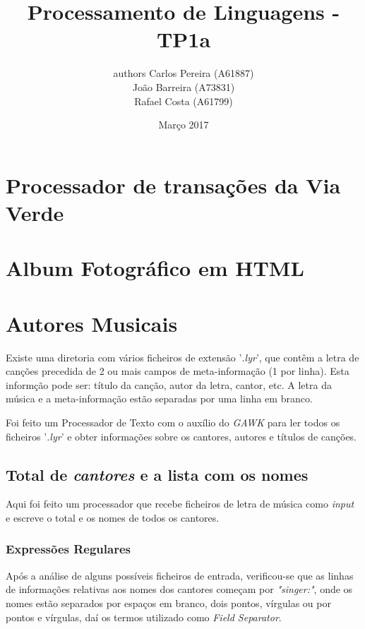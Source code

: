\documentclass{article}
\title{\textbf{Processamento de Linguagens - TP1a}}
\author{\begin{tabular}{authors}
            \textbf{} Carlos Pereira (A61887) \\ João Barreira (A73831) \\ Rafael Costa (A61799)
        \end{tabular}
       }
\date{Março 2017}
\begin{document}
\maketitle

\section{Processador de transações da Via Verde}



\section{Album Fotográfico em HTML}



\section{Autores Musicais}

Existe uma diretoria com vários ficheiros de extensão '\emph{.lyr}', que contêm a letra de canções precedida de 2 ou mais campos de meta-informação (1 por linha). Esta informção pode ser: título da canção, autor da letra, cantor, etc. A letra da música e a meta-informação estão separadas por uma linha em branco.

Foi feito um Processador de Texto com o auxílio do \emph{GAWK} para ler todos os ficheiros '\emph{.lyr}' e obter informações sobre os cantores, autores e títulos de canções.

\subsection{Total de \emph{cantores} e a lista com os nomes}

Aqui foi feito um processador que recebe ficheiros de letra de música como \emph{input} e escreve o total e os nomes de todos os cantores.

\subsubsection{Expressões Regulares}

Após a análise de alguns possíveis ficheiros de entrada, verificou-se que as linhas de informações relativas aos nomes dos cantores começam por \emph{"singer:"}, onde os nomes estão separados por espaços em branco, dois pontos, vírgulas ou por pontos e vírgulas, daí os termos utilizado como \emph{Field Separator}.
\end{document}
